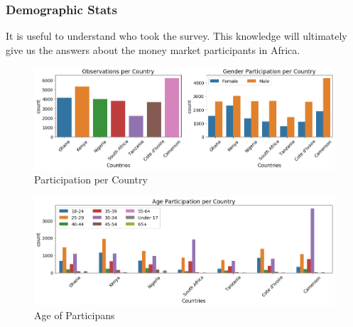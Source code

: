 \hypertarget{demographic-stats}{%
\subsubsection{Demographic Stats}\label{demographic-stats}}

It is useful to understand who took the survey. This knowledge will
ultimately give us the answers about the money market participants in
Africa.

\begin{Schunk}
\begin{figure}[H]

{\centering \includegraphics[width=1.15\linewidth]{../../artifacts/obs_per_country} 

}

\caption[Participation per Country]{Participation per Country}\label{fig:pc}
\end{figure}
\end{Schunk}

\begin{Schunk}
\begin{figure}[H]

{\centering \includegraphics[width=1.15\linewidth]{../../artifacts/participant_age} 

}

\caption[Age of Participans]{Age of Participans}\label{fig:pa}
\end{figure}
\end{Schunk}

